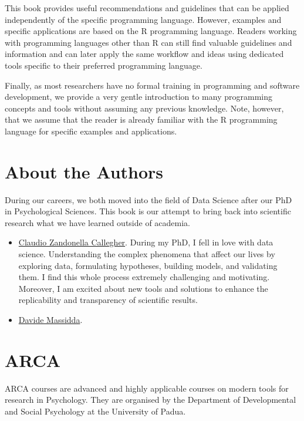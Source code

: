 \documentclass[
  11pt,
]{book}
\providecommand{\tightlist}{%
  \setlength{\itemsep}{0pt}\setlength{\parskip}{0pt}}
\begin{document}
This book provides useful recommendations and guidelines that can be applied independently of the specific programming language. However, examples and specific applications are based on the R programming language. Readers working with programming languages other than R can still find valuable guidelines and information and can later apply the same workflow and ideas using dedicated tools specific to their preferred programming language.

Finally, as most researchers have no formal training in programming and software development, we provide a very gentle introduction to many programming concepts and tools without assuming any previous knowledge. Note, however, that we assume that the reader is already familiar with the R programming language for specific examples and applications.

\hypertarget{about-the-authors}{%
\section*{About the Authors}\label{about-the-authors}}

During our careers, we both moved into the field of Data Science after our PhD in Psychological Sciences. This book is our attempt to bring back into scientific research what we have learned outside of academia.

\begin{itemize}
\tightlist
\item
  \href{https://claudiozandonella.netlify.app/}{Claudio Zandonella Callegher}. During my PhD, I fell in love with data science. Understanding the complex phenomena that affect our lives by exploring data, formulating hypotheses, building models, and validating them. I find this whole process extremely challenging and motivating. Moreover, I am excited about new tools and solutions to enhance the replicability and transparency of scientific results.
\item
  \href{https://www.linkedin.com/in/davidemassidda/}{Davide Massidda}.
\end{itemize}

\hypertarget{arca}{%
\section*{ARCA}\label{arca}}

ARCA courses are advanced and highly applicable courses on modern tools for research in Psychology. They are organised by the Department of Developmental and Social Psychology at the University of Padua.
\end{document}
